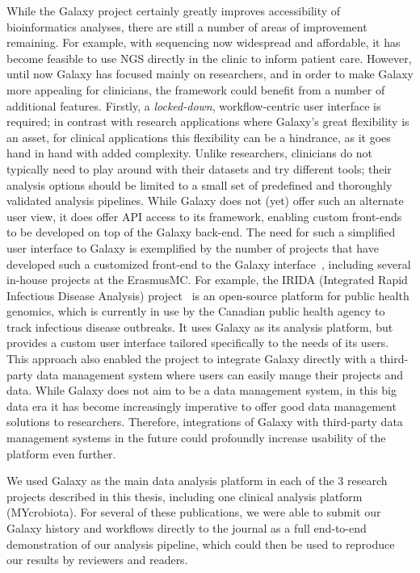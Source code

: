 While the Galaxy project certainly greatly improves accessibility of bioinformatics analyses, there are still a number of areas of improvement remaining.
For example, with sequencing now widespread and affordable, it has become feasible to use NGS directly in the clinic to inform patient care.
However, until now Galaxy has focused mainly on researchers, and in order to make Galaxy more appealing for clinicians, the framework could benefit from a number of additional features.
Firstly, a \emph{locked-down}, workflow-centric user interface is required; in contrast with research applications where Galaxy's great flexibility is an asset, for clinical applications this flexibility can be a hindrance, as it goes hand in hand with added complexity.
Unlike researchers, clinicians do not typically need to play around with their datasets and try different tools; their analysis options should be limited to a small set of predefined and thoroughly validated analysis pipelines.
While Galaxy does not (yet) offer such an alternate user view, it does offer API access to its framework, enabling custom front-ends to be developed on top of the Galaxy back-end.
The need for such a simplified user interface to Galaxy is exemplified by the number of projects that have developed such a customized front-end to the Galaxy interface~\cite{klingstrom2017galaksio,matthews2018integrated,lemoine2019ngphylogeny,SEEK2015}, including several in-house projects at the ErasmusMC\@.
For example, the IRIDA (Integrated Rapid Infectious Disease Analysis) project~\cite{matthews2018integrated} is an open-source platform for public health genomics, which is currently in use by the Canadian public health agency to track infectious disease outbreaks.
It uses Galaxy as its analysis platform, but provides a custom user interface tailored specifically to the needs of its users. This approach also enabled the project to integrate Galaxy directly with a third-party data management system where users can easily mange their projects and data.
While Galaxy does not aim to be a data management system, in this big data era it has become increasingly imperative to offer good data management solutions to researchers. Therefore, integrations of Galaxy with third-party data management systems in the future could profoundly increase usability of the platform even further.

We used Galaxy as the main data analysis platform in each of the 3 research projects described in this thesis, including one clinical analysis platform (MYcrobiota). For several of these publications, we were able to submit our Galaxy history and workflows directly to the journal as a full end-to-end demonstration of our analysis pipeline, which could then be used to reproduce our results by reviewers and readers.


